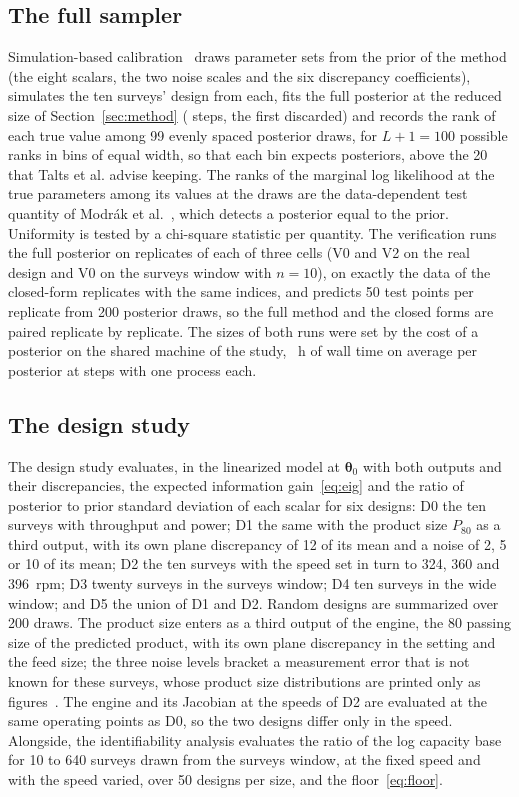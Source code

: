 \subsection{The full sampler}

Simulation-based calibration~\cite{talts} draws \sbcN{} parameter sets from the prior of the method (the eight scalars, the two
noise scales and the six discrepancy coefficients), simulates the ten surveys' design from each, fits the full posterior at
the reduced size of Section~\ref{sec:method} (\sbcSteps{} steps, the first \sbcBurn{} discarded) and records the rank of each
true value among 99 evenly spaced posterior draws, for $L+1=100$ possible ranks in \sbcBins{} bins of equal width, so that each
bin expects \sbcPerBin{} posteriors, above the 20 that Talts et al. advise keeping. The ranks of the marginal log likelihood at
the true parameters among its values at the draws are the data-dependent test quantity of Modr\'ak et al.~\cite{modrak}, which
detects a posterior equal to the prior. Uniformity is tested by a chi-square statistic per quantity. The verification runs the
full posterior on \verReps{} replicates of each of three cells (V0 and V2 on the real design and V0 on the surveys window with
$n=10$), on exactly the data of the closed-form replicates with the same indices, and predicts 50 test points per replicate from
200 posterior draws, so the full method and the closed forms are paired replicate by replicate. The sizes of both runs were set
by the cost of a posterior on the shared machine of the study, \sbcWallHours~h of wall time on average per posterior at
\sbcSteps{} steps with one process each.

\subsection{The design study}

The design study evaluates, in the linearized model at $\boldsymbol\theta_0$ with both outputs and their discrepancies, the
expected information gain~\eqref{eq:eig} and the ratio of posterior to prior standard deviation of each scalar for six designs:
D0 the ten surveys with throughput and power; D1 the same with the product size $P_{80}$ as a third output, with its own plane
discrepancy of 12\pct{} of its mean and a noise of 2, 5 or 10\pct{} of its mean; D2 the ten surveys with the speed set in turn
to 324, 360 and 396~rpm; D3 twenty surveys in the surveys window; D4 ten surveys in the wide window; and D5 the union of D1 and
D2. Random designs are summarized over 200 draws. The product size enters as a third output of the engine, the 80\pct{}
passing size of the predicted product, with its own plane discrepancy in the setting and the feed size; the three noise
levels bracket a measurement error that is not known for these surveys, whose product size distributions are printed only as
figures~\cite{rocha}. The engine and its
Jacobian at the speeds of D2 are evaluated at the same operating points as D0, so the two designs differ only in the speed.
Alongside, the identifiability analysis evaluates the ratio of the log capacity base for 10 to 640 surveys drawn from the surveys
window, at the fixed speed and with the speed varied, over 50 designs per size, and the floor~\eqref{eq:floor}.
